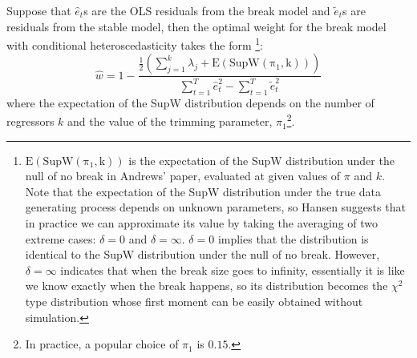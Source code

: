 \begin{lemma} \label{lem:2}
Suppose that $\hat{e}_t$s are the OLS residuals from the break model and $\tilde{e}_t$s are residuals from the stable model, then the optimal weight for the break model with conditional heteroscedasticity takes the form \footnote{$\mathrm{E(SupW(\pi_1,k))}$ is the expectation of the SupW distribution under the null of no break in Andrews' paper, evaluated at given values of $\pi$ and $k$. Note that the expectation of the SupW distribution under the true data generating process depends on unknown parameters, so Hansen suggests that in practice we can approximate its value by taking the averaging of two extreme cases: $\delta = 0$ and $\delta = \infty$. $\delta = 0$ implies that the distribution is identical to the SupW distribution under the null of no break. However, $\delta = \infty$ indicates that when the break size goes to infinity, essentially it is like we know exactly when the break happens, so its distribution becomes the $\chi^2$ type distribution whose first moment can be easily obtained without simulation.}:
\begin{equation}
	\hat{w} = 1 - \frac{\frac{1}{2}(\sum_{j=1}^{k}\lambda_j + \mathrm{E(SupW(\pi_1,k))})}{\sum_{t=1}^{T}\hat{e}_t^2 - \sum_{t=1}^{T}\tilde{e}_t^2}
\end{equation}
where the expectation of the SupW distribution depends on the number of regressors $k$ and the value of the trimming parameter, $\pi_1$\footnote{In practice, a popular choice of $\pi_1$ is $0.15$.}.
\end{lemma} 